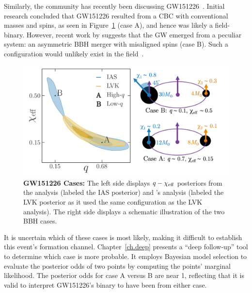 Similarly, the community has recently been discussing GW151226~\cite{Chia:2022:PhRvD, Mateu-Lucena:2021:arXiv, Nitz:2021:ApJ}. 
Initial research concluded that GW151226 resulted from a CBC with conventional masses and spins, as seen in Figure~\ref{fig:gw151226_cases} (case A), and hence was likely a field-binary.
However, recent work by \citet{Chia:2022:PhRvD} suggests that the GW emerged from a peculiar system: an asymmetric BBH merger with misaligned  spins (case B). Such a configuration would unlikely exist in the field~\cite{Chia:2022:PhRvD}.

\begin{figure}
\begin{center}
  \centerline{\includegraphics[width=1.1\linewidth]{src/figures/gw151226_cases.png}}
  \caption{\textbf{GW151226 Cases:} The left side displays $q-\chi_{\rm eff}$ posteriors from the \citet{Chia:2022:PhRvD} analysis (labeled the IAS posterior) and \citet{Mateu-Lucena:2021:arXiv}'s analysis (labeled the LVK posterior as it used the same configuration as the LVK analysis). The right side displays a schematic illustration of the two BBH cases. 
  }
  \label{fig:gw151226_cases}
\end{center}
\end{figure}


It is uncertain which of these cases is most likely, making it difficult to establish this event's formation channel.
Chapter~\ref{ch.deep} presents a ``deep follow-up'' tool to determine which case is  more probable.
It employs Bayesian model selection to evaluate the posterior odds of two points by computing the points' marginal likelihood.
The posterior odds for case A versus B are near 1, reflecting that it is valid to interpret GW151226's binary to have been from either case.

